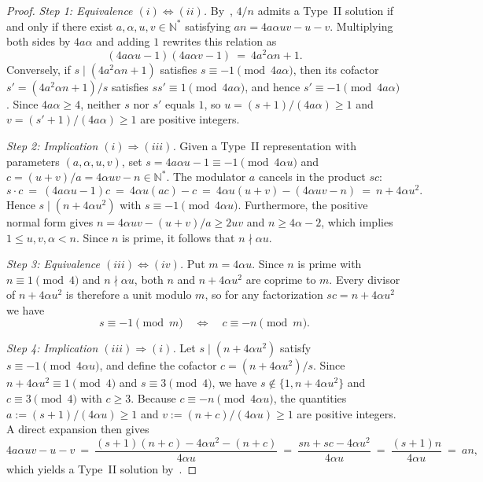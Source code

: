 \documentclass[11pt, a4paper]{article}
\theoremstyle{plain}
\theoremstyle{definition}
\newcommand{\N}{\mathbb{N}}
\begin{document}
\begin{proof}
\emph{Step 1: Equivalence $(i)\Leftrightarrow(ii)$.} By~\cite[Thm.~3.9]{dahan2026a}, $4/n$ admits a Type~II solution if and only if there exist $a,\alpha,u,v\in\N^{\ast}$ satisfying $an=4a\alpha uv-u-v$. Multiplying both sides by $4a\alpha$ and adding $1$ rewrites this relation as
$$(4a\alpha u-1)(4a\alpha v-1)\ =\ 4a^{2}\alpha n+1.$$
Conversely, if $s\mid(4a^{2}\alpha n+1)$ satisfies $s\equiv-1\pmod{4a\alpha}$, then its cofactor $s'=(4a^{2}\alpha n+1)/s$ satisfies $ss'\equiv1\pmod{4a\alpha}$, and hence $s'\equiv-1\pmod{4a\alpha}$. Since $4a\alpha\ge4$, neither $s$ nor $s'$ equals $1$, so $u=(s+1)/(4a\alpha)\ge1$ and $v=(s'+1)/(4a\alpha)\ge1$ are positive integers.

\medskip\noindent\emph{Step 2: Implication $(i)\Rightarrow(iii)$.} Given a Type~II representation with parameters $(a,\alpha,u,v)$, set $s=4a\alpha u-1\equiv-1\pmod{4\alpha u}$ and $c=(u+v)/a=4\alpha uv-n\in\N^{\ast}$. The modulator $a$ cancels in the product $sc$:
$$s\cdot c\ =\ (4a\alpha u-1)c\ =\ 4\alpha u(ac)-c\ =\ 4\alpha u(u+v)-(4\alpha uv-n)\ =\ n+4\alpha u^{2}.$$
Hence $s\mid(n+4\alpha u^{2})$ with $s\equiv-1\pmod{4\alpha u}$. Furthermore, the positive normal form gives $n=4\alpha uv-(u+v)/a\ge 2uv$ and $n\ge 4\alpha-2$, which implies $1\le u,v,\alpha<n$. Since $n$ is prime, it follows that $n\nmid\alpha u$.

\medskip\noindent\emph{Step 3: Equivalence $(iii)\Leftrightarrow(iv)$.} Put $m=4\alpha u$. Since $n$ is prime with $n\equiv1\pmod 4$ and $n\nmid\alpha u$, both $n$ and $n+4\alpha u^{2}$ are coprime to $m$. Every divisor of $n+4\alpha u^{2}$ is therefore a unit modulo $m$, so for any factorization $sc=n+4\alpha u^{2}$ we have
\[
s\equiv-1\pmod m\quad\Longleftrightarrow\quad c\equiv-n\pmod m.
\]

\medskip\noindent\emph{Step 4: Implication $(iii)\Rightarrow(i)$.} Let $s\mid(n+4\alpha u^{2})$ satisfy $s\equiv-1\pmod{4\alpha u}$, and define the cofactor $c=(n+4\alpha u^{2})/s$. Since $n+4\alpha u^{2}\equiv1\pmod 4$ and $s\equiv3\pmod 4$, we have $s\notin\{1,n+4\alpha u^{2}\}$ and $c\equiv3\pmod 4$ with $c\ge3$. Because $c\equiv-n\pmod{4\alpha u}$, the quantities $a:=(s+1)/(4\alpha u)\ge1$ and $v:=(n+c)/(4\alpha u)\ge1$ are positive integers. A direct expansion then gives
$$4a\alpha uv-u-v\ =\ \frac{(s+1)(n+c)-4\alpha u^{2}-(n+c)}{4\alpha u}\ =\ \frac{sn+sc-4\alpha u^{2}}{4\alpha u}\ =\ \frac{(s+1)n}{4\alpha u}\ =\ an,$$
which yields a Type~II solution by~\cite[Thm.~3.9]{dahan2026a}.
\end{proof}
\end{document}
